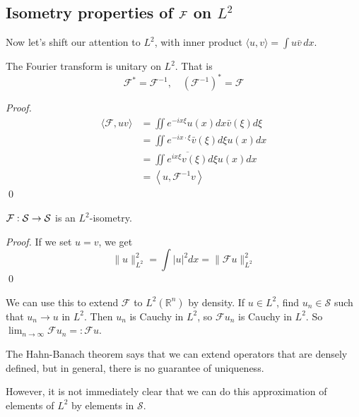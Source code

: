\subsection{Isometry properties of $\mathcal{F}$ on $L^2$}

Now let's shift our attention to $L^2$, with inner product $\langle u,v \rangle = \int u\bar v\, dx.$

\begin{proposition}
The Fourier transform is unitary on $L^2$. That is 
\[
    \mathcal{F}^{*}={\mathcal{F}}^{-1}, \quad\left(\mathcal{F}^{-1}\right)^{*}=\mathcal{F}
\]
\end{proposition}

\begin{proof}
    \[
        \begin{aligned}
            \langle\mathcal{F}, u v\rangle &=\iint e^{-i x \xi} u(x) d x \bar{v}(\xi) d \xi \\
            &=\iint e^{-i x \cdot \xi} \bar{v}(\xi) d \xi u(x) d x \\
            &=\iint \overline{e^{i x \xi} v(\xi)} d \xi u(x) d x \\
            &=\left\langle u, \mathcal{F}^{-1} v\right\rangle
            \end{aligned}
    \]
    \qed 
\end{proof}

\begin{theorem}
$\mathcal{F}: \mathcal{S} \to \mathcal{S}$ is an $L^2$-isometry.
\end{theorem}

\begin{proof}
    If we set $u=v$, we get
$$
\|u\|_{L^{2}}^{2}=\int|u|^{2} d x=\|\mathcal{F} u\|_{L^{2}}^{2}
$$
\qed
\end{proof}
We can use this to extend $\mathcal{F}$ to $L^{2}\left(\mathbb{R}^{n}\right)$ by density. If $u \in L^{2}$, find $u_{n} \in \mathcal{S}$ such that $u_{n} \rightarrow u$ in $L^{2}$. Then $u_{n}$ is Cauchy in $L^{2}$, so $\mathcal{F} u_{n}$ is Cauchy in $L^{2}$. So $\lim _{n \rightarrow \infty} \mathcal{F} u_{n}=: \mathcal{F} u$.

\begin{remark}
    The Hahn-Banach theorem says that we can extend operators that are densely defined, but in general, there is no guarantee of uniqueness.
\end{remark}
However, it is not immediately clear that we can do this approximation of elements of $L^{2}$ by elements in $\mathcal{S}$.

